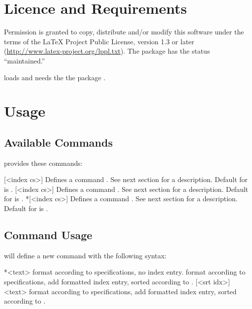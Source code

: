 \documentclass{cnpkgdoc}
\begin{document}
\section{Licence and Requirements}
Permission is granted to copy, distribute and/or modify this software under the
terms of the \LaTeX{} Project Public License, version 1.3 or later
(\url{http://www.latex-project.org/lppl.txt}). The package has the status
``maintained.''

\idxcmds loads and needs the the package .

\section{Usage}
\subsection{Available Commands}
\idxcmds provides these commands:
\begin{beschreibung}
 [<index cs>]{}\newline
   Defines a command . See next section for a description. Default for
    is .
 [<index cs>]{}\newline
   Defines a command . See next section for a description. Default for
    is .
 *[<index cs>]{}\newline
   Defines a command . See next section for a description. Default for
    is .
\end{beschreibung}

\subsection{Command Usage}
 will define a new command with the following syntax:
\begin{beschreibung}
 *{<text>} format  according to specifications, no
   index entry.
  format  according to specifications, add
   formatted index entry, sorted according to .
 [<srt idx>]{<text>} format  according to specifications,
   add formatted index entry, sorted according to .
\end{beschreibung}
\end{document}
